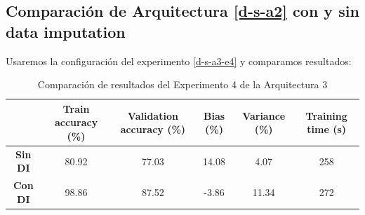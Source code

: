 \documentclass{article}
\begin{document}
		\subsection{Comparaci\'on de Arquitectura \ref{d-s-a2} con y sin data imputation}
		\label{d-s-dp-2}
			Usaremos la configuraci\'on del experimento \ref{d-s-a3-e4} y comparamos resultados:
			\begin{table}[!h]
				\begin{center}
					\begin{tabular}{ c | c | c | c | c | c |}
						\ & \textbf{Train accuracy (\%)} & \textbf{Validation accuracy (\%)} & \textbf{Bias (\%)} & \textbf{Variance (\%)} & \textbf{Training time (s)} \\ \hline
						\textbf{Sin DI} & 80.92 & 77.03 & 14.08 & 4.07 & 258\\ \hline
						\textbf{Con DI} & 98.86 & 87.52 & -3.86 & 11.34 & 272 \\ \hline
					\end{tabular}
					\caption{Comparaci\'on de resultados del Experimento 4 de la Arquitectura 3}
					\label{tab:res-d-a1-e2}
				\end{center}
			\end{table}
\end{document}
